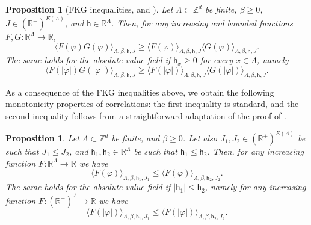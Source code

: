 \documentclass[11pt,a4paper]{article}
\newtheorem{proposition}[theorem]{Proposition}
\theoremstyle{definition}
\numberwithin{equation}{section}
\newcommand\R{\mathbb{R}}
\begin{document}
\begin{proposition}[FKG inequalities, {\cite[Propositions~A.1--A.2]{GunaratnamPanagiotisPanisSeveroPhi42022} and \cite[Corollary~6.4]{LammersOtt2021}}] \label{prop: FKG phi4} Let $\Lambda \subset \mathbb Z^d$ be finite, $\beta\geq0$, $J\in (\mathbb R^+)^{E(\Lambda)}$, and $\mathsf{h}\in \mathbb R^\Lambda$. Then, for any increasing and bounded functions $F,G:\R^\Lambda\to \R$,
\begin{equation}
    \langle F(\varphi)G(\varphi)\rangle_{\Lambda,\beta,\mathsf{h},J}\geq \langle F(\varphi)\rangle_{\Lambda,\beta,\mathsf{h},J}\langle G(\varphi)\rangle_{\Lambda,\beta,\mathsf{h},J}.
\end{equation}
The same holds for the absolute value field if $\mathsf h_x \geq 0$ for every $x \in \Lambda$, namely
\begin{equation}
    \langle F(|\varphi|)G(|\varphi|) \rangle_{\Lambda,\beta,\mathsf{h},J}\geq \langle F(|\varphi|) \rangle_{\Lambda,\beta,\mathsf{h},J} \langle G(|\varphi|) \rangle_{\Lambda,\beta,\mathsf{h},J}.
\end{equation}
\end{proposition}

As a consequence of the FKG inequalities above, we obtain the following monotonicity properties of correlations: the first inequality is standard, and the second inequality follows from a straightforward adaptation of the proof of \cite[Lemma 2.13]{GunaratnamPanagiotisPanisSeveroPhi42022}. 

\begin{proposition}\label{prop:stoc_monotonicity}
Let $\Lambda \subset \mathbb Z^d$ be finite, and $\beta\geq0$. Let also $J_1,J_2\in (\mathbb R^+)^{E(\Lambda)}$ be such that $J_1\leq J_2$, and $\mathsf{h}_1,\mathsf{h}_2\in \mathbb R^\Lambda$ be such that $\mathsf{h}_1\leq \mathsf{h}_2$. Then, for any increasing function $F:\mathbb{R}^{\Lambda}\to\mathbb{R}$ we have 
\begin{equation}
\langle F(\varphi) \rangle_{\Lambda,\beta,\mathsf{h}_1,J_1}\leq \langle F(\varphi) \rangle_{\Lambda,\beta,\mathsf{h}_2,J_2}.  
\end{equation}
The same holds for the absolute value field if $|\mathsf{h}_1| \leq \mathsf{h}_2$, namely for any increasing function $F: (\mathbb{R}^+)^{\Lambda}\to\mathbb{R}$ we have 
\begin{equation}
\langle F(|\varphi|) \rangle_{\Lambda,\beta,\mathsf{h}_1,J_1}\leq \langle F(|\varphi|) \rangle_{\Lambda,\beta,\mathsf{h}_2,J_2}.  
\end{equation}
\end{proposition}
\end{document}
